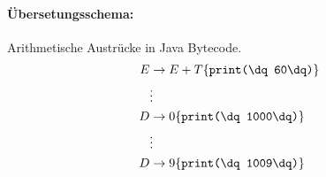 \paragraph{Übersetungsschema:} Arithmetische Austrücke in Java Bytecode.
\begin{align*}
 E &\to E + T \{\texttt{print(\dq 60\dq)}\} \\
  &\vdots \\
 D &\to 0\{\texttt{print(\dq 1000\dq)}\}\\
  &\vdots\\
 D &\to 9\{\texttt{print(\dq 1009\dq)}\}\\
\end{align*}

